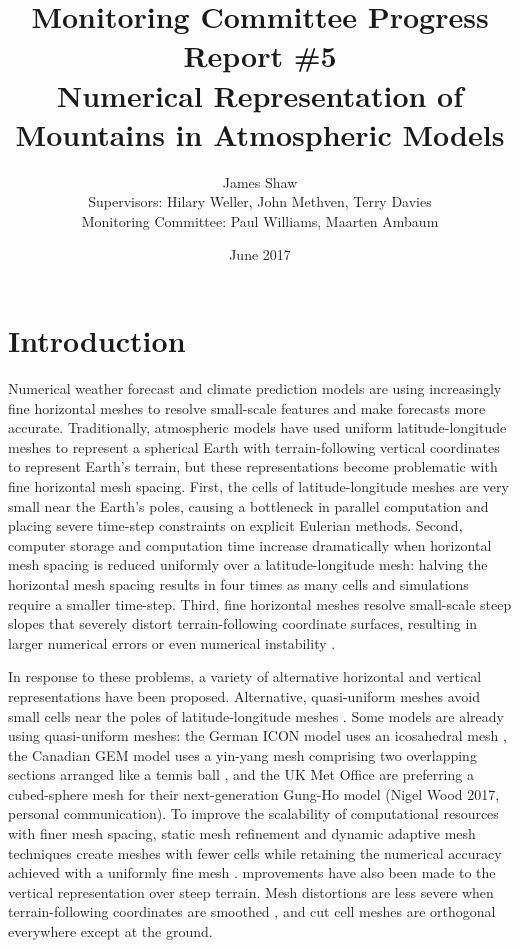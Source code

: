 \documentclass[a4paper,11pt]{article}
\title{
\vspace*{-2em}
Monitoring Committee Progress Report \#5\\
\vspace*{1em}
\Large{Numerical Representation of Mountains in Atmospheric Models}}
\author{James Shaw
\vspace{0.5em} \\
\large{Supervisors: Hilary Weller, John Methven, Terry Davies}
\vspace{0.5em} \\
\large{Monitoring Committee: Paul Williams, Maarten Ambaum}}
\date{June 2017}
\begin{document}
\maketitle

\section{Introduction}

Numerical weather forecast and climate prediction models are using increasingly fine horizontal meshes to resolve small-scale features and make forecasts more accurate.  Traditionally, atmospheric models have used uniform latitude-longitude meshes to represent a spherical Earth with terrain-following vertical coordinates to represent Earth's terrain, but these representations become problematic with fine horizontal mesh spacing.
First, the cells of latitude-longitude meshes are very small near the Earth's poles, causing a bottleneck in parallel computation \citep{staniforth-thuburn2012} and placing severe time-step constraints on explicit Eulerian methods.
Second, computer storage and computation time increase dramatically when horizontal mesh spacing is reduced uniformly over a latitude-longitude mesh: halving the horizontal mesh spacing results in four times as many cells and simulations require a smaller time-step.
Third, fine horizontal meshes resolve small-scale steep slopes that severely distort terrain-following coordinate surfaces, resulting in larger numerical errors \citep{schaer2002} or even numerical instability \citep{webster2003}.

In response to these problems, a variety of alternative horizontal and vertical representations have been proposed.  Alternative, quasi-uniform meshes avoid small cells near the poles of latitude-longitude meshes \citep{staniforth-thuburn2012}.  Some models are already using quasi-uniform meshes: the German ICON model uses an icosahedral mesh \citep{wan2013}, the Canadian GEM model uses a yin-yang mesh comprising two overlapping sections arranged like a tennis ball \citep{qaddouri2011}, and the UK Met Office are preferring a cubed-sphere mesh for their next-generation Gung-Ho model (Nigel Wood 2017, personal communication).
To improve the scalability of computational resources with finer mesh spacing, static mesh refinement and dynamic adaptive mesh techniques create meshes with fewer cells while retaining the numerical accuracy achieved with a uniformly fine mesh \citep{jablonowski2009}.
mprovements have also been made to the vertical representation over steep terrain.  Mesh distortions are less severe when terrain-following coordinates are smoothed \citep{leuenberger2010,klemp2011}, and cut cell meshes are orthogonal everywhere except at the ground.
\end{document}
